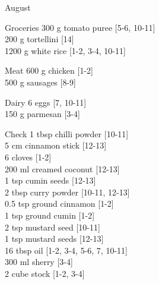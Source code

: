 \begin{menu}{August}
\begin{shoppinglist}{Groceries}
      300 g tomato puree 
        {\scriptsize[5-6, 10-11]}\\
      200 g tortellini 
        {\scriptsize[14]}\\
      1200 g white rice 
        {\scriptsize[1-2, 3-4, 10-11]}\\
      \end{shoppinglist}%
      \par\vfil %
      \begin{shoppinglist}{Meat}
      600 g chicken 
        {\scriptsize[1-2]}\\
      500 g sausages 
        {\scriptsize[8-9]}\\
      \end{shoppinglist}%
      \begin{shoppinglist}{Dairy}
      6  eggs 
        {\scriptsize[7, 10-11]}\\
      150 g parmesan 
        {\scriptsize[3-4]}\\
      \end{shoppinglist}%
      \par\vfil %
      \vfil\clearpage %
      \begin{shoppinglist}{Check}
      1 tbsp chilli powder 
        {\scriptsize[10-11]}\\
      5 cm cinnamon stick 
        {\scriptsize[12-13]}\\
      6  cloves 
        {\scriptsize[1-2]}\\
      200 ml creamed coconut 
        {\scriptsize[12-13]}\\
      1 tsp cumin seeds 
        {\scriptsize[12-13]}\\
      2 tbsp curry powder 
        {\scriptsize[10-11, 12-13]}\\
      0.5 tsp ground cinnamon 
        {\scriptsize[1-2]}\\
      1 tsp ground cumin 
        {\scriptsize[1-2]}\\
      2 tsp mustard seed 
        {\scriptsize[10-11]}\\
      1 tsp mustard seeds 
        {\scriptsize[12-13]}\\
      16 tbsp oil 
        {\scriptsize[1-2, 3-4, 5-6, 7, 10-11]}\\
      300 ml sherry 
        {\scriptsize[3-4]}\\
      2 cube stock 
        {\scriptsize[1-2, 3-4]}\\
      \end{shoppinglist}%

\end{menu}
